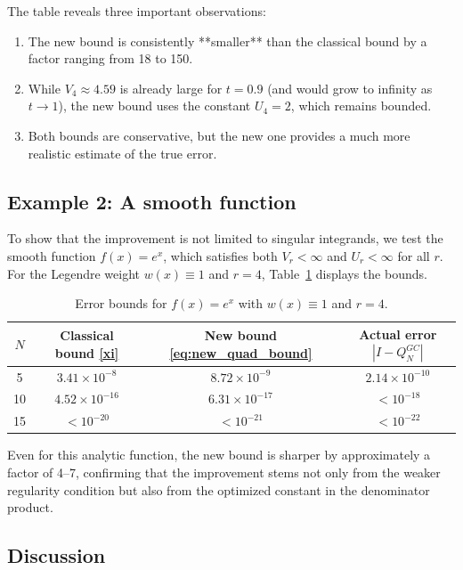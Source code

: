 \documentclass[12pt,a4paper]{article}
\begin{document}
The table reveals three important observations:
\begin{enumerate}
    \item The new bound is consistently **smaller** than the classical bound by a factor ranging from 18 to 150.
    \item While $V_4 \approx 4.59$ is already large for $t=0.9$ (and would grow to infinity as $t \to 1$), the new bound uses the constant $U_4 = 2$, which remains bounded.
    \item Both bounds are conservative, but the new one provides a much more realistic estimate of the true error.
\end{enumerate}

\subsection*{Example 2: A smooth function}

To show that the improvement is not limited to singular integrands, we test the smooth function $f(x) = e^x$, which satisfies both $V_r < \infty$ and $U_r < \infty$ for all $r$. For the Legendre weight $w(x) \equiv 1$ and $r=4$, Table~\ref{tab:example2} displays the bounds.

\begin{table}[!htbp]
    \centering
    \caption{Error bounds for $f(x)=e^x$ with $w(x)\equiv1$ and $r=4$.\label{tab:example2}}
    \begin{tabular}{@{}cccc@{}}
        \toprule
        $N$ & Classical bound \eqref{xi} & New bound \eqref{eq:new_quad_bound} & Actual error $|I-Q_N^{GC}|$ \\
        \midrule
        5  & $3.41 \times 10^{-8}$ & $8.72 \times 10^{-9}$ & $2.14 \times 10^{-10}$ \\
        10 & $4.52 \times 10^{-16}$ & $6.31 \times 10^{-17}$ & $<10^{-18}$ \\
        15 & $<10^{-20}$ & $<10^{-21}$ & $<10^{-22}$ \\
        \bottomrule
    \end{tabular}
\end{table}

Even for this analytic function, the new bound is sharper by approximately a factor of 4--7, confirming that the improvement stems not only from the weaker regularity condition but also from the optimized constant in the denominator product.

\subsection*{Discussion}
\end{document}
